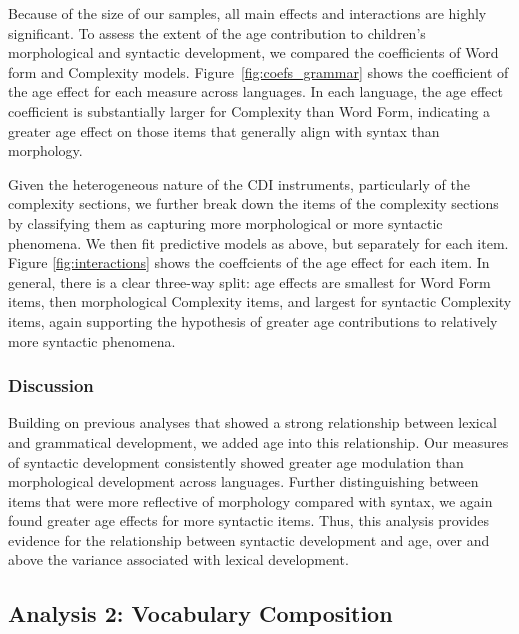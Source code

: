 \documentclass[10pt,letterpaper]{article}
\begin{document}
Because of the size of our samples, all main effects and interactions are highly significant. To assess the extent of the age contribution to children's morphological and syntactic development, we compared the coefficients of Word form and Complexity models. Figure~\ref{fig:coefs_grammar} shows the coefficient of the age effect for each measure across languages. In each language, the age effect coefficient is substantially larger for Complexity than Word Form, indicating a greater age effect on those items that generally align with syntax than morphology.

Given the heterogeneous nature of the CDI instruments, particularly of the complexity sections, we further break down the items of the complexity sections by classifying them as capturing more morphological or more syntactic phenomena. We then fit predictive models as above, but separately for each item. Figure \ref{fig:interactions} shows the coeffcients of the age effect for each item. In general, there is a clear three-way split: age effects are smallest for Word Form items, then morphological Complexity items, and largest for syntactic Complexity items, again supporting the hypothesis of greater age contributions to relatively more syntactic phenomena. 

\subsubsection{Discussion}

Building on previous analyses that showed a strong relationship between lexical and grammatical development, we added age into this relationship. Our measures of syntactic development consistently showed greater age modulation than morphological development across languages. Further distinguishing between items that were more reflective of morphology compared with syntax, we again found greater age effects for more syntactic items.  Thus, this analysis provides evidence for the relationship between syntactic development and age, over and above the variance associated with lexical development. 

\subsection{Analysis 2: Vocabulary Composition}
\end{document}
